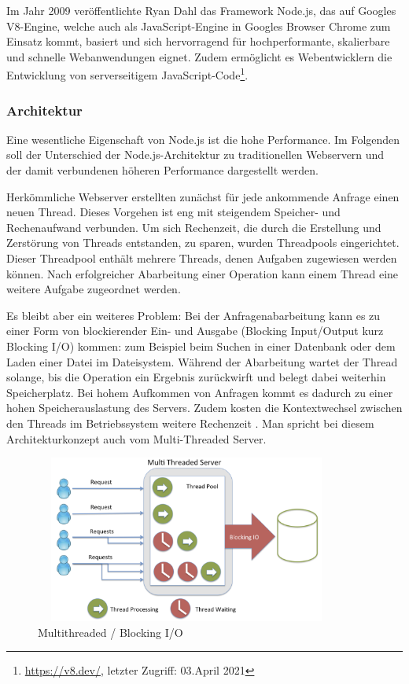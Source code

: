 Im Jahr 2009 veröffentlichte Ryan Dahl das Framework Node.js, das auf Googles V8-Engine, welche auch als JavaScript-Engine in Googles Browser Chrome zum Einsatz kommt, basiert und sich hervorragend für hochperformante, skalierbare und schnelle Webanwendungen eignet. Zudem ermöglicht es Webentwicklern die Entwicklung von serverseitigem JavaScript-Code\footnote{\url{https://v8.dev/}, letzter Zugriff: 03.April 2021}.


\subsubsection{Architektur}
Eine wesentliche Eigenschaft von Node.js ist die hohe Performance. Im Folgenden soll der Unterschied der Node.js-Architektur zu traditionellen Webservern und der damit verbundenen höheren Performance dargestellt werden.
\newline

\noindent
Herkömmliche Webserver erstellten zunächst für jede ankommende Anfrage einen neuen Thread. Dieses Vorgehen ist eng mit steigendem Speicher- und Rechenaufwand verbunden. Um sich Rechenzeit, die durch die Erstellung und Zerstörung von Threads entstanden, zu sparen, wurden Threadpools eingerichtet. Dieser Threadpool enthält mehrere Threads, denen Aufgaben zugewiesen werden können. Nach erfolgreicher Abarbeitung einer Operation kann einem Thread eine weitere Aufgabe zugeordnet werden.
\newline

\noindent
Es bleibt aber ein weiteres Problem: Bei der Anfragenabarbeitung kann es zu einer Form von blockierender Ein- und Ausgabe (Blocking Input/Output kurz Blocking I/O) kommen: zum Beispiel beim Suchen in einer Datenbank oder dem Laden einer Datei im Dateisystem.
 Während der Abarbeitung wartet der Thread solange, bis die Operation ein Ergebnis zurückwirft und belegt dabei weiterhin Speicherplatz. 
 Bei hohem Aufkommen von Anfragen kommt es dadurch zu einer hohen Speicherauslastung des Servers. Zudem kosten die Kontextwechsel zwischen den Threads im Betriebssystem weitere Rechenzeit \cite{Node1.05}. Man spricht bei diesem Architekturkonzept auch vom Multi-Threaded Server.
\newline

\begin{figure}[h]
\centering
\includegraphics[width=10cm, height = 5.5cm]{images/nodejs_otherthreading.png}
\caption{Multithreaded / Blocking I/O \cite{Node1.1}}
\end{figure}
 
